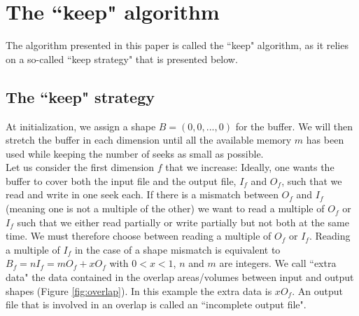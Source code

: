 \documentclass[conference]{IEEEtran}
\begin{document}
\section*{The ``keep" algorithm}
The algorithm presented in this paper is called the ``keep" algorithm, as it relies on a so-called ``keep strategy" that is presented below.

\subsection{The ``keep" strategy}
At initialization, we assign a shape $B = (0, 0,..., 0)$ for the buffer.
We will then stretch the buffer in each dimension until all the available memory $m$ has been used while keeping the number of seeks as small as possible. \\

Let us consider the first dimension $f$ that we increase: Ideally, one wants the buffer to cover both the input file and the output file, $I_f$ and $O_f$, such that we read and write in one seek each.
If there is a mismatch between $O_f$ and $I_f$ (meaning one is not a multiple of the other) we want to read a multiple of $O_f$ or $I_f$ such that we either read partially or write partially but not both at the same time.
We must therefore choose between reading a multiple of $O_f$ or $I_f$.
Reading a multiple of $I_f$ in the case of a shape mismatch is equivalent to $B_f = nI_f = mO_f+xO_f$ with $0<x<1$, $n$ and $m$ are integers.
We call ``extra data" the data contained in the overlap areas/volumes between input and output shapes (Figure \ref{fig:overlap}).
In this example the extra data is $xO_f$.
An output file that is involved in an overlap is called an ``incomplete output file". \\
\end{document}
